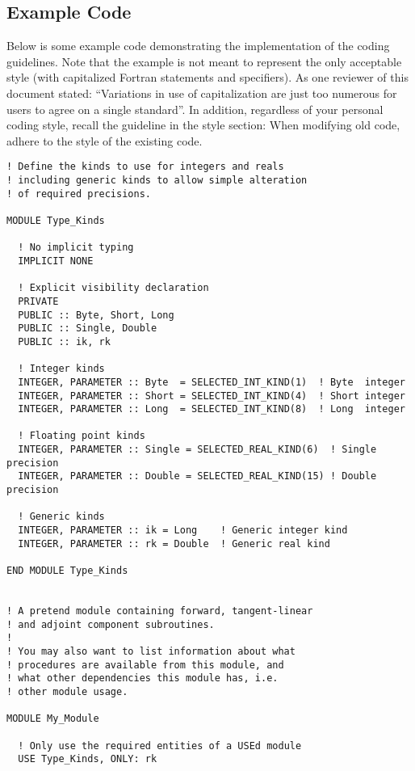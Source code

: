 \begin{appendix}
\newpage
\section{Example Code}
\label{app:example_code}
Below is some example code demonstrating the implementation of the coding guidelines. Note that the example is not meant to represent the only acceptable style (with capitalized Fortran statements and specifiers). As one reviewer of this document stated: ``Variations in use of capitalization are just too numerous for users to agree on a single standard''. In addition, regardless of your personal coding style, recall the guideline in the style section: When modifying old code, adhere to the style of the existing code.
\begin{verbatim}
! Define the kinds to use for integers and reals
! including generic kinds to allow simple alteration
! of required precisions.

MODULE Type_Kinds

  ! No implicit typing
  IMPLICIT NONE

  ! Explicit visibility declaration
  PRIVATE
  PUBLIC :: Byte, Short, Long
  PUBLIC :: Single, Double
  PUBLIC :: ik, rk

  ! Integer kinds
  INTEGER, PARAMETER :: Byte  = SELECTED_INT_KIND(1)  ! Byte  integer
  INTEGER, PARAMETER :: Short = SELECTED_INT_KIND(4)  ! Short integer
  INTEGER, PARAMETER :: Long  = SELECTED_INT_KIND(8)  ! Long  integer

  ! Floating point kinds
  INTEGER, PARAMETER :: Single = SELECTED_REAL_KIND(6)  ! Single precision
  INTEGER, PARAMETER :: Double = SELECTED_REAL_KIND(15) ! Double precision

  ! Generic kinds
  INTEGER, PARAMETER :: ik = Long    ! Generic integer kind
  INTEGER, PARAMETER :: rk = Double  ! Generic real kind

END MODULE Type_Kinds


! A pretend module containing forward, tangent-linear
! and adjoint component subroutines.
!
! You may also want to list information about what
! procedures are available from this module, and
! what other dependencies this module has, i.e. 
! other module usage.

MODULE My_Module

  ! Only use the required entities of a USEd module
  USE Type_Kinds, ONLY: rk


\end{verbatim}
\end{appendix}
